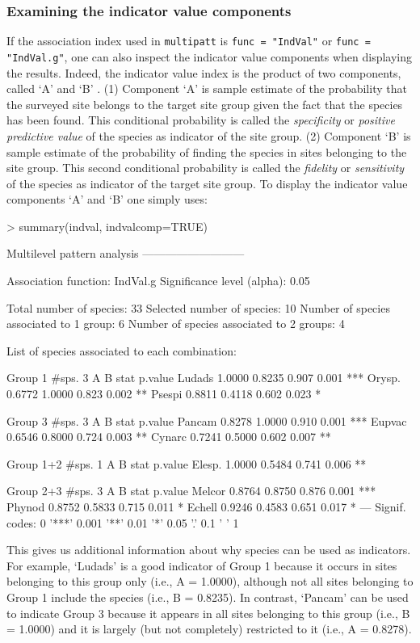 \documentclass[11pt,a4paper]{article}
\begin{document}
\subsubsection{Examining the indicator value components}
If the association index used in \texttt{multipatt} is \texttt{func = "IndVal"} or \texttt{func = "IndVal.g"}, one can also inspect the indicator value components when displaying the results. Indeed, the indicator value index is the product of two components, called `A' and `B' \citep{Dufrene1997}\citep{DeCaceres2009}. (1) Component `A' is sample estimate of the probability that the surveyed site belongs to the target site group given the fact that the species has been found. This conditional probability is called the \emph{specificity} or \emph{positive predictive value} of the species as indicator of the site group. (2) Component `B' is sample estimate of the probability of finding the species in sites belonging to the site group. This second conditional probability is called the \emph{fidelity} or \emph{sensitivity} of the species as indicator of the target site group. To display the indicator value components `A' and `B' one simply uses:
\begin{Schunk}
\begin{Sinput}
> summary(indval, indvalcomp=TRUE)
\end{Sinput}
\begin{Soutput}
 Multilevel pattern analysis
 ---------------------------

 Association function: IndVal.g
 Significance level (alpha): 0.05

 Total number of species: 33
 Selected number of species: 10 
 Number of species associated to 1 group: 6 
 Number of species associated to 2 groups: 4 

 List of species associated to each combination: 

 Group 1  #sps.  3 
            A      B  stat p.value    
Ludads 1.0000 0.8235 0.907   0.001 ***
Orysp. 0.6772 1.0000 0.823   0.002 ** 
Psespi 0.8811 0.4118 0.602   0.023 *  

 Group 3  #sps.  3 
            A      B  stat p.value    
Pancam 0.8278 1.0000 0.910   0.001 ***
Eupvac 0.6546 0.8000 0.724   0.003 ** 
Cynarc 0.7241 0.5000 0.602   0.007 ** 

 Group 1+2  #sps.  1 
            A      B  stat p.value   
Elesp. 1.0000 0.5484 0.741   0.006 **

 Group 2+3  #sps.  3 
            A      B  stat p.value    
Melcor 0.8764 0.8750 0.876   0.001 ***
Phynod 0.8752 0.5833 0.715   0.011 *  
Echell 0.9246 0.4583 0.651   0.017 *  
---
Signif. codes:  0 '***' 0.001 '**' 0.01 '*' 0.05 '.' 0.1 ' ' 1 
\end{Soutput}
\end{Schunk}
This gives us additional information about why species can be used as indicators. For example, `Ludads' is a good indicator of Group 1 because it occurs in sites belonging to this group only (i.e., A = 1.0000), although not all sites belonging to Group 1 include the species (i.e., B = 0.8235). In contrast, `Pancam' can be used to indicate Group 3 because it appears in all sites belonging to this group (i.e., B = 1.0000) and it is largely (but not completely) restricted to it (i.e., A = 0.8278).
\end{document}

